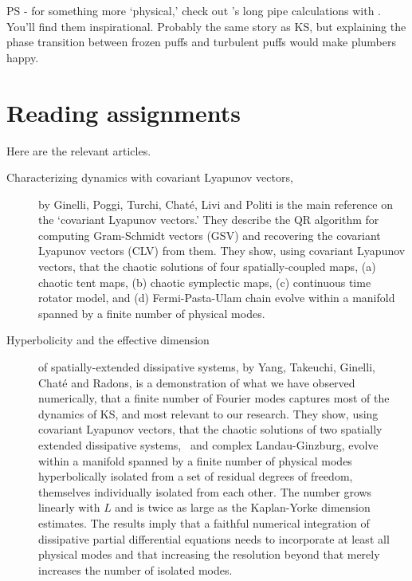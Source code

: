 PS - for something more `physical,' check out
's long pipe calculations with
.
You'll find them inspirational. Probably the same story as KS, but explaining the
phase transition between frozen puffs and turbulent puffs would make plumbers happy.

\section{Reading assignments}

 Here are the relevant articles.

\begin{description}
\item[Characterizing dynamics with covariant Lyapunov
              vectors,] by
Ginelli, Poggi, Turchi, Chat\'{e}, Livi and Politi
is the main reference on the
`covariant Lyapunov vectors.' They describe the QR algorithm for
computing Gram-Schmidt vectors (GSV) and recovering
the covariant Lyapunov vectors (CLV) from them.
They show, using covariant Lyapunov vectors, that
  the chaotic solutions of four spatially-coupled maps,
(a) chaotic tent maps,
(b) chaotic symplectic maps,
(c) continuous time rotator model, and
(d) Fermi-Pasta-Ulam chain
  evolve within a manifold spanned by a finite number
  of physical modes.

\item[Hyperbolicity and the effective dimension] of
    spatially-extended dissipative
    systems, by Yang, Takeuchi, Ginelli, Chat\'{e}
    and Radons,
 is a demonstration of what we
  have observed numerically, that a finite number of Fourier modes
  captures most of the dynamics of KS, and most relevant to our research.
 They show, using covariant Lyapunov vectors, that
  the chaotic solutions of two spatially extended dissipative
  systems, \KS\ and complex Landau-Ginzburg,
  evolve within a manifold spanned by a finite number
  of physical modes hyperbolically isolated from a set of
  residual degrees of freedom, themselves individually
  isolated from each other. The number grows linearly with
  $L$ and is twice as large as the Kaplan-Yorke dimension estimates.
  The results imply that a
  faithful numerical integration of dissipative
  partial differential equations needs to incorporate at
  least all physical modes and that increasing the resolution
  beyond that
  merely increases the number of isolated modes.


\end{description}
